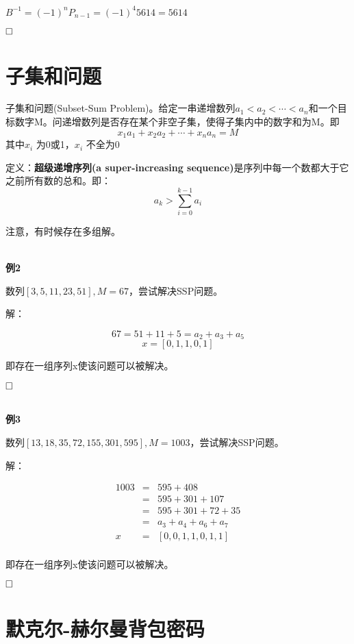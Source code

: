 \documentclass{article}
\begin{document}
$B^{-1} = (-1)^{n}P_{n-1}=(-1)^{4}5614 = 5614$ 

$\hfill\square$ 


\section{子集和问题}
子集和问题(Subset-Sum Problem)。给定一串递增数列$a_{1}<a_{2}< \cdots < a_{n}$和一个目标数字M。问递增数列是否存在某个非空子集，使得子集内中的数字和为M。即
$$x_1a_1+x_2a_2+\cdots+x_na_n = M$$
其中$x_i$ 为0或1，$x_i$ 不全为0



定义：\textbf{超级递增序列(a super-increasing sequence)}是序列中每一个数都大于它之前所有数的总和。即：
$$
a_{k}>\sum_{i=0}^{k-1} a_{i}
$$

注意，有时候存在多组解。


~\\

\textbf{例2}

数列$[3,5,11,23,51],M=67$，尝试解决SSP问题。

解：

$$67=51+11+5=a_2+a_3+a_5$$
$$x=[0,1,1,0,1]$$

即存在一组序列x使该问题可以被解决。

$\hfill\square$ 




~\\

\textbf{例3}

数列$[13,18,35,72,155,301,595],M=1003$，尝试解决SSP问题。

解：

\begin{eqnarray}   
\label{eq}
1003&=&595 + 408 \nonumber \\ 
&=&  595+301+107\nonumber \\ 
&=& 595+301+72+35\nonumber \\ 
&=& a_3+a_4+a_6+a_7\nonumber \\ 
x&=&[0,0,1,1,0,1,1]\nonumber \\ 
\nonumber 
\end{eqnarray}

即存在一组序列x使该问题可以被解决。


$\hfill\square$ 


\clearpage

\section{默克尔-赫尔曼背包密码}
\end{document}
